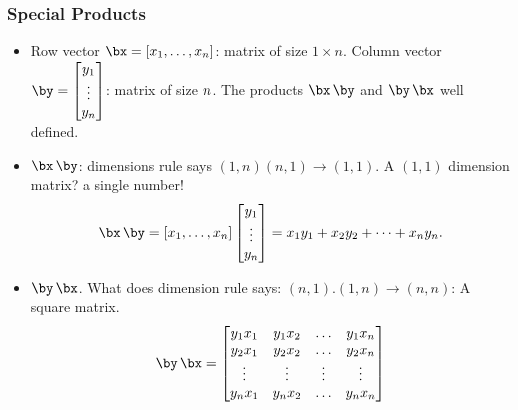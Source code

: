 \documentclass[8pt]{beamer}
\begin{document}
\begin{frame}
  \frametitle{Special Products}
  \begin{itemize}
  \item Row vector $\bx = [x_1,\dots,x_n]$: matrix of size $1\times n$. Column vector $\by =
    \begin{bmatrix}
      y_1\\\vdots\\y_n
    \end{bmatrix}
    $: matrix of size $n\time 1$. The products $\bx\,\by $ and $\by\,\bx$ well defined. 
  \item $\bx \, \by $: dimensions rule says $(1,n)(n,1) \to (1,1)$. A $(1,1)$ dimension matrix? a single number!
    $$
    \bx\,\by=  [x_1,\dots,x_n]     \begin{bmatrix}
      y_1\\\vdots\\y_n
    \end{bmatrix}
    = x_1 y_1 + x_2 y_2 + \dots + x_n y_n.
    $$
  \item $\by\,\bx$. What does dimension rule says: $(n,1).(1,n)\to (n,n)$: A square matrix.
    $$
    \by\,\bx =
    \begin{bmatrix}
      y_1 x_1 & y_1 x_2 & \hdots & y_1 x_n\\ 
      y_2 x_1 & y_2 x_2 & \hdots & y_2 x_n\\ 
      \vdots & \vdots &  \vdots & \vdots\\
      y_n x_1 & y_n x_2 & \hdots & y_n x_n\\ 
    \end{bmatrix}
    $$
  \end{itemize}
\end{frame}
\end{document}
